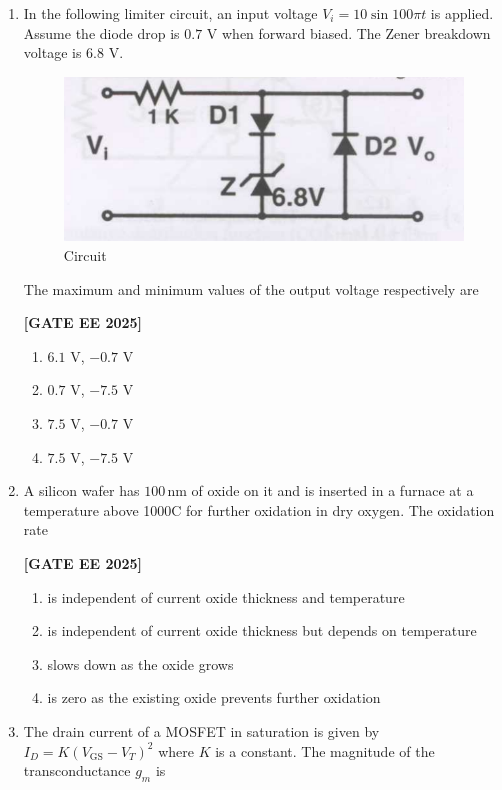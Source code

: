 \documentclass[12pt]{article}
\begin{document}
\begin{enumerate}[leftmargin=2.5em, label=\textbf{Q.\arabic*}., itemsep=2em]
\item In the following limiter circuit, an input voltage $V_i=10\sin100\pi t$ is applied. Assume the diode drop is $0.7$ V when forward biased. The Zener breakdown voltage is $6.8$ V.
\begin{figure}[H]\centering
\includegraphics[width=0.7\columnwidth]{figs/q17.png}
\caption{Circuit}
\label{fig:q17}
\end{figure}

The maximum and minimum values of the output voltage respectively are
 
\noindent \textbf{[GATE EE 2025]}
\begin{multicols}{4}
\begin{enumerate}
  \item $6.1$ V, $-0.7$ V
  \item $0.7$ V, $-7.5$ V
  \item $7.5$ V, $-0.7$ V
  \item $7.5$ V, $-7.5$ V
\end{enumerate}
\end{multicols}

\item A silicon wafer has $100\,\mathrm{nm}$ of oxide on it and is inserted in a furnace at a temperature above 1000\degree C for further oxidation in dry oxygen. The oxidation rate
 
\noindent \textbf{[GATE EE 2025]}
\begin{enumerate}
  \item is independent of current oxide thickness and temperature
  \item is independent of current oxide thickness but depends on temperature
  \item slows down as the oxide grows
  \item is zero as the existing oxide prevents further oxidation
\end{enumerate}

\item The drain current of a MOSFET in saturation is given by $I_D=K(V_{\mathrm{GS}}-V_T)^2$ where $K$ is a constant.
The magnitude of the transconductance $g_m$ is
 

\end{enumerate}
\end{document}

